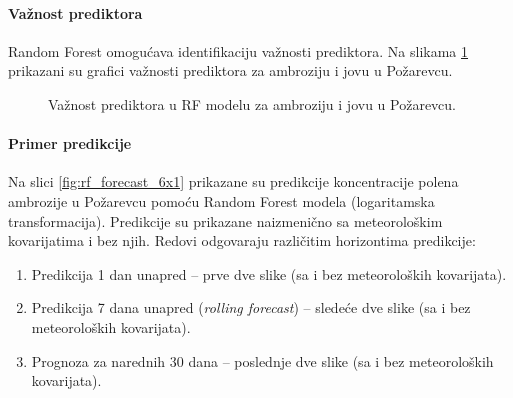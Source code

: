 \documentclass[12pt]{article}
\begin{document}
\begin{table}[h!]
\centering
\caption{Prophet – početak sezone polena: stvarni datum i predikcija 7 dana unapred.}
\label{tab:rf_start_season}
\end{table}

\paragraph{\textbf{Važnost prediktora}}  
Random Forest omogućava identifikaciju važnosti prediktora. Na slikama \ref{fig:rf_feature_importance} prikazani su grafici važnosti prediktora za ambroziju i jovu u Požarevcu.

\begin{figure}[H]
    \centering
    \caption{Važnost prediktora u RF modelu za ambroziju i jovu u Požarevcu.}
    \label{fig:rf_feature_importance}
\end{figure}

\paragraph{\textbf{Primer predikcije}}  
Na slici \ref{fig:rf_forecast_6x1} prikazane su predikcije koncentracije polena ambrozije u Požarevcu pomoću Random Forest modela (logaritamska transformacija).  
Predikcije su prikazane naizmenično sa meteorološkim kovarijatima i bez njih.  
Redovi odgovaraju različitim horizontima predikcije:  
\begin{enumerate}
    \item Predikcija 1 dan unapred – prve dve slike (sa i bez meteoroloških kovarijata).
    \item Predikcija 7 dana unapred (\textit{rolling forecast}) – sledeće dve slike (sa i bez meteoroloških kovarijata).
    \item Prognoza za narednih 30 dana – poslednje dve slike (sa i bez meteoroloških kovarijata).
\end{enumerate}
\end{document}
